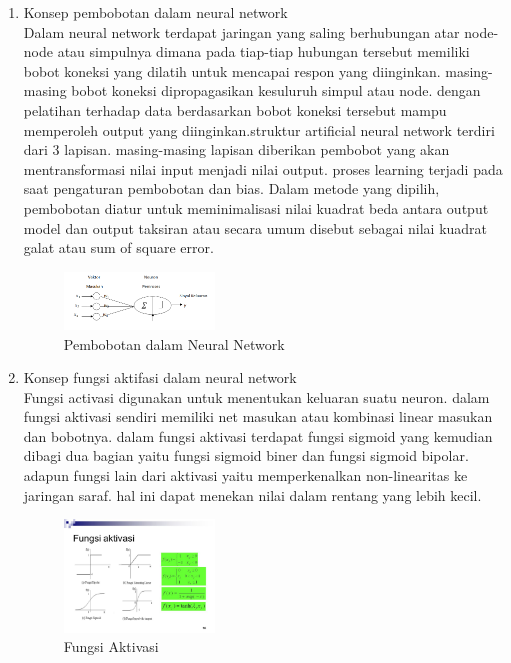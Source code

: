 \begin{enumerate}
\item Konsep pembobotan dalam neural network\\
Dalam neural network terdapat jaringan yang saling berhubungan atar node-node atau simpulnya dimana pada tiap-tiap hubungan tersebut memiliki bobot koneksi yang dilatih untuk mencapai respon yang diinginkan. masing-masing bobot koneksi dipropagasikan kesuluruh simpul atau node. dengan pelatihan terhadap data berdasarkan bobot koneksi tersebut mampu memperoleh output yang diinginkan.struktur artificial neural network terdiri dari 3 lapisan. masing-masing lapisan diberikan pembobot yang akan mentransformasi nilai input menjadi nilai output. proses learning terjadi pada saat pengaturan pembobotan dan bias. Dalam metode yang dipilih, pembobotan diatur untuk meminimalisasi nilai kuadrat beda antara output model dan output taksiran atau secara umum disebut sebagai nilai kuadrat galat atau sum of square error.
\hfill\break
	\begin{figure}[H]
		\includegraphics[width=4cm]{figures/1174054/6/3.png}
		\centering
		\caption{Pembobotan dalam Neural Network}
	\end{figure}

\item Konsep fungsi aktifasi dalam neural network\\
Fungsi activasi digunakan untuk menentukan keluaran suatu neuron. dalam fungsi aktivasi sendiri memiliki net masukan atau kombinasi linear masukan dan bobotnya. dalam fungsi aktivasi terdapat fungsi sigmoid yang kemudian dibagi dua bagian yaitu fungsi sigmoid biner dan fungsi sigmoid bipolar. adapun fungsi lain dari aktivasi yaitu memperkenalkan non-linearitas ke jaringan saraf. hal ini dapat menekan nilai dalam rentang yang lebih kecil.
\hfill\break
	\begin{figure}[H]
		\includegraphics[width=4cm]{figures/1174054/6/4.jpg}
		\centering
		\caption{Fungsi Aktivasi}
	\end{figure}


\end{enumerate}
